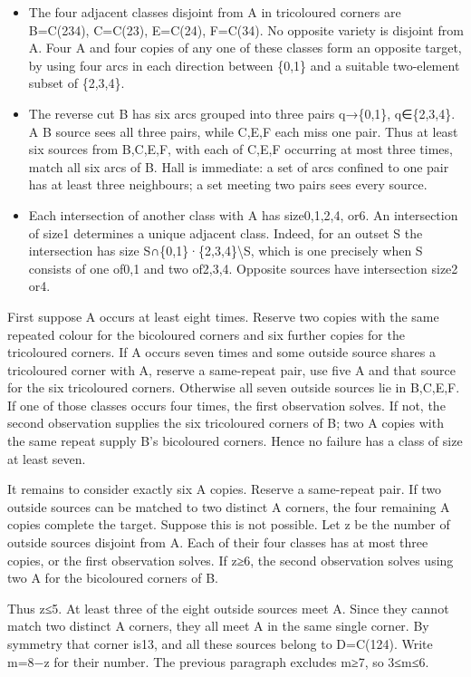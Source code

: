 \documentclass[
  10pt,
]{article}
\providecommand{\tightlist}{%
  \setlength{\itemsep}{0pt}\setlength{\parskip}{0pt}}
\begin{document}
\begin{itemize}
\tightlist
\item
  The four adjacent classes disjoint from A in tricoloured corners are
  B=C(234), C=C(23), E=C(24), F=C(34). No opposite variety is disjoint
  from A. Four A and four copies of any one of these classes form an
  opposite target, by using four arcs in each direction between \{0,1\}
  and a suitable two-element subset of \{2,3,4\}.
\item
  The reverse cut B has six arcs grouped into three pairs q→\{0,1\},
  q∈\{2,3,4\}. A B source sees all three pairs, while C,E,F each miss
  one pair. Thus at least six sources from B,C,E,F, with each of C,E,F
  occurring at most three times, match all six arcs of B. Hall is
  immediate: a set of arcs confined to one pair has at least three
  neighbours; a set meeting two pairs sees every source.
\item
  Each intersection of another class with A has size0,1,2,4, or6. An
  intersection of size1 determines a unique adjacent class. Indeed, for
  an outset S the intersection has size
  \textbar S∩\{0,1\}\textbar·\textbar\{2,3,4\}\textbackslash S\textbar,
  which is one precisely when S consists of one of0,1 and two of2,3,4.
  Opposite sources have intersection size2 or4.
\end{itemize}

First suppose A occurs at least eight times. Reserve two copies with the
same repeated colour for the bicoloured corners and six further copies
for the tricoloured corners. If A occurs seven times and some outside
source shares a tricoloured corner with A, reserve a same-repeat pair,
use five A and that source for the six tricoloured corners. Otherwise
all seven outside sources lie in B,C,E,F. If one of those classes occurs
four times, the first observation solves. If not, the second observation
supplies the six tricoloured corners of B; two A copies with the same
repeat supply B's bicoloured corners. Hence no failure has a class of
size at least seven.

It remains to consider exactly six A copies. Reserve a same-repeat pair.
If two outside sources can be matched to two distinct A corners, the
four remaining A copies complete the target. Suppose this is not
possible. Let z be the number of outside sources disjoint from A. Each
of their four classes has at most three copies, or the first observation
solves. If z≥6, the second observation solves using two A for the
bicoloured corners of B.

Thus z≤5. At least three of the eight outside sources meet A. Since they
cannot match two distinct A corners, they all meet A in the same single
corner. By symmetry that corner is13, and all these sources belong to
D=C(124). Write m=8−z for their number. The previous paragraph excludes
m≥7, so 3≤m≤6.
\end{document}
